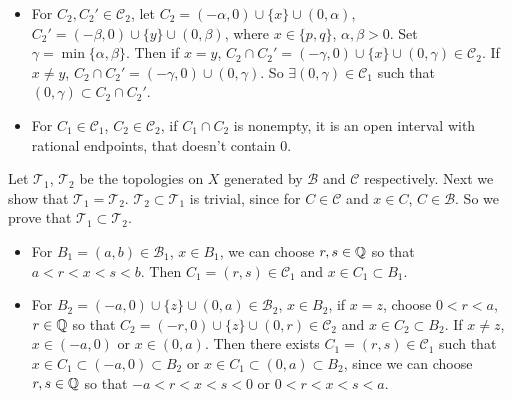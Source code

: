 \documentclass[12pt]{report}
\newcommand{\B}{\mathcal{B}}
\renewcommand{\C}{\mathcal{C}}
\newcommand{\T}{\mathcal{T}}
\begin{document}
\begin{enumerate}
\begin{itemize}
        \item For \(C_2, C_2' \in \C_2\), let \(C_2 = (-\alpha, 0) \cup \{x\} \cup (0, \alpha)\), \(C_2' = (-\beta, 0) \cup \{y\} \cup (0, \beta)\), where \(x \in \{p, q\}\), \(\alpha, \beta > 0\). Set \(\gamma = \min\{\alpha, \beta\}\). Then if \(x = y\), \(C_2 \cap C_2' = (-\gamma, 0) \cup \{x\} \cup (0, \gamma) \in \C_2\). If \(x \neq y\), \(C_2 \cap C_2' = (-\gamma, 0) \cup (0, \gamma)\). So \(\exists (0, \gamma) \in \C_1\) such that \((0, \gamma) \subset C_2 \cap C_2'\).

        \item For \(C_1 \in \C_1\), \(C_2 \in \C_2\), if \(C_1 \cap C_2\) is nonempty, it is an open interval with rational endpoints, that doesn't contain \(0\).
    \end{itemize}

    Let \(\T_1\), \(\T_2\) be the topologies on \(X\) generated by \(\B\) and \(\C\) respectively. Next we show that \(\T_1 = \T_2\). \(\T_2 \subset \T_1\) is trivial, since for \(C \in \C\) and \(x \in C\), \(C \in \B\). So we prove that \(\T_1 \subset \T_2\).
    \begin{itemize}
        \item For \(B_1 = (a, b) \in \B_1\), \(x \in B_1\), we can choose \(r, s \in \mathbb{Q}\) so that \(a < r < x < s < b\). Then \(C_1 = (r, s) \in \C_1\) and \(x \in C_1 \subset B_1\).

        \item For \(B_2 = (-a, 0) \cup \{z\} \cup (0, a) \in \B_2\), \(x \in B_2\), if \(x = z\), choose \(0 < r < a\), \(r \in \mathbb{Q}\) so that \(C_2 = (-r, 0) \cup \{z\} \cup (0, r) \in \C_2\) and \(x \in C_2 \subset B_2\). If \(x \neq z\), \(x \in (-a, 0)\) or \(x \in (0, a)\). Then there exists \(C_1 = (r, s) \in \C_1\) such that \(x \in C_1 \subset (-a, 0) \subset B_2\) or \(x \in C_1 \subset (0, a) \subset B_2\), since we can choose \(r, s \in \mathbb{Q}\) so that \(-a < r < x < s < 0\) or \(0 < r < x < s < a\).
    \end{itemize}


\end{enumerate}
\end{document}

